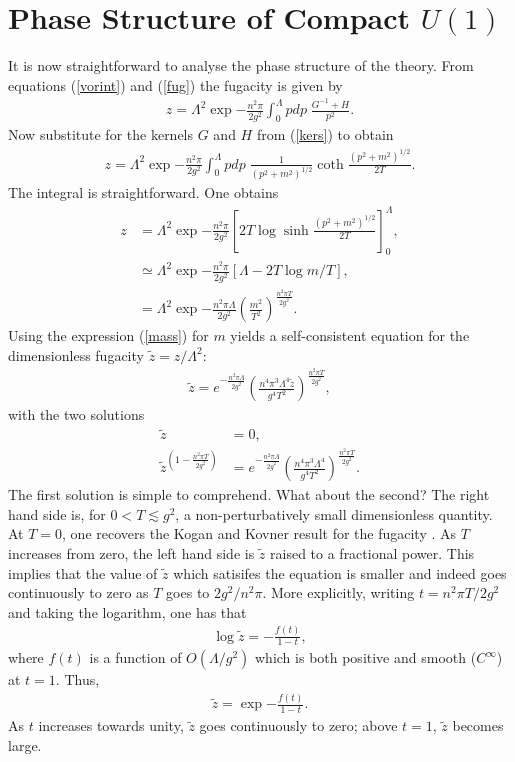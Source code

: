\documentclass[a4paper,a4paper]{article}
\begin{document}
%
\section{Phase Structure of Compact $U(1)$} \label{sec:phase}
It is now straightforward to analyse the phase structure of the theory. 
From equations (\ref{vorint}) and (\ref{fug}) the fugacity is given by
\begin{gather}
z = \Lambda^2 \exp{- \frac{n^2 \pi}{2 g^2} \int_{0}^{\Lambda} pdp \; \frac{G^{-1} + H}{p^2} }.
\end{gather}
Now substitute for the kernels $G$ and $H$ from (\ref{kers}) to obtain
\begin{gather}
z = \Lambda^2 \exp{- \frac{n^2 \pi}{2 g^2} \int_{0}^{\Lambda} pdp \; \frac{1}{(p^2+m^2)^{1/2}}
\coth \frac{(p^2+m^2)^{1/2}}{2T}}.
\end{gather}
The integral is straightforward. One obtains
\begin{align}
z &= \Lambda^2 \exp{- \frac{n^2 \pi}{2 g^2} \left[ 2T \log \sinh \frac{(p^2 + m^2)^{1/2}}{2T}\right]_{0}^{\Lambda}},
\nonumber \\
&\simeq \Lambda^2 \exp{- \frac{n^2 \pi}{2 g^2}\left[  \Lambda - 2T \log m/T \right]}, \nonumber \\
&= \Lambda^2 \exp{- \frac{n^2 \pi \Lambda}{2 g^2}} \left( \frac{m^2}{T^2} \right)^{\frac{n^2 \pi T}{2 g^2}}.
\end{align}Using the expression (\ref{mass}) for $m$ yields a self-consistent equation for the dimensionless
fugacity $\tilde{z} = z/\Lambda^2$:
\begin{gather} \label{fugfug}
\tilde{z} = e^{- \frac{n^2 \pi \Lambda}{2 g^2}} 
\left( \frac{n^4 \pi^3 \Lambda^4 \tilde{z}}{g^4 T^2} \right)^{\frac{n^2 \pi T}{2 g^2}},
\end{gather}
with the two solutions
\begin{align} \label{zlh}
\tilde{z} &= 0, \nonumber \\
\tilde{z}^{(1 - \frac{n^2 \pi T}{2 g^2})} &= e^{- \frac{n^2 \pi \Lambda}{2 g^2}} 
\left( \frac{n^4 \pi^3 \Lambda^4}{g^4 T^2} \right)^{\frac{n^2 \pi T}{2 g^2}}.
\end{align}
The first solution is simple to comprehend. What about the second? The right hand side
is, for $0 < T \lesssim g^2$, a non-perturbatively small dimensionless quantity. At $T=0$,
one recovers the Kogan and Kovner result for the fugacity \cite{Kogan:1995vb}. As $T$ increases from zero,
the left hand side is $\tilde{z}$ raised to a fractional power. This implies that the value of $\tilde{z}$
which satisifes the equation is smaller and indeed goes continuously to zero as $T$ goes to $2 g^2/n^2\pi$.
More explicitly,
writing $t = n^2 \pi T/2 g^2$ and taking the logarithm, 
one has that
\begin{gather}
\log \tilde{z} = - \frac{f(t)}{1-t},
\end{gather}
where $f(t)$ is a function of $O(\Lambda/g^2)$ which is both positive and smooth ($C^{\infty}$) at $t=1$. Thus,
\begin{gather} \label{tilz}
\tilde{z} = \exp{- \frac{f(t)}{1-t}}.
\end{gather}
As $t$ increases towards unity, $\tilde{z}$ goes continuously to zero; above $t=1$, $\tilde{z}$ becomes large.
\end{document}
